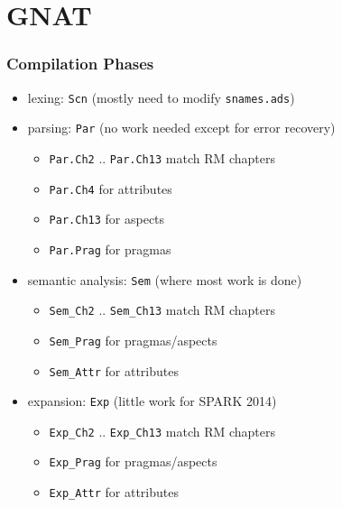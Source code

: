 \documentclass{beamer}
\newenvironment{specialframe}{%
  \begin{frame}[fragile,environment=specialframe]}{\end{frame}}
\begin{document}
\section{GNAT}

\begin{specialframe}
  \frametitle{Compilation Phases}

\begin{itemize}
\item lexing: \verb|Scn| (mostly need to modify \verb|snames.ads|)
\item parsing: \verb|Par| (no work needed except for error recovery)
  \begin{itemize}
  \item \verb|Par.Ch2| .. \verb|Par.Ch13| match RM chapters
  \item \verb|Par.Ch4| for attributes
  \item \verb|Par.Ch13| for aspects
  \item \verb|Par.Prag| for pragmas
  \end{itemize}
\item semantic analysis: \verb|Sem| (where most work is done)
  \begin{itemize}
  \item \verb|Sem_Ch2| .. \verb|Sem_Ch13| match RM chapters
  \item \verb|Sem_Prag| for pragmas/aspects
  \item \verb|Sem_Attr| for attributes
  \end{itemize}
\item expansion: \verb|Exp| (little work for SPARK 2014)
  \begin{itemize}
  \item \verb|Exp_Ch2| .. \verb|Exp_Ch13| match RM chapters
  \item \verb|Exp_Prag| for pragmas/aspects
  \item \verb|Exp_Attr| for attributes
  \end{itemize}
\end{itemize}

\end{specialframe}
\end{document}

